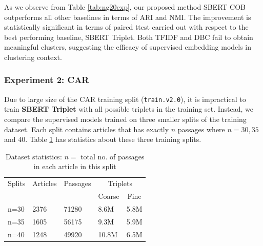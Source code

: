 \documentclass[11pt,a4paper]{article}
\begin{document}
As we observe from Table \ref{tab:ng20exp}, our proposed method SBERT COB outperforms all other baselines in terms of ARI and NMI. The improvement is statistically significant in terms of paired ttest carried out with respect to the best performing baseline, SBERT Triplet. Both TFIDF and DBC fail to obtain meaningful clusters, suggesting the efficacy of supervised embedding models in clustering context.

\subsubsection{Experiment 2: CAR} Due to large size of the CAR training split (\texttt{train.v2.0}), it is impractical to train \textbf{SBERT Triplet} with all possible triplets in the training set. Instead, we compare the supervised models trained on three smaller splits of the training dataset. Each split contains articles that has exactly $n$ passages where $n=30, 35$ and $40$. Table \ref{tab:datsplit} has statistics about these three training splits. 

\begin{table}[h]
\caption{Dataset statistics: $n=$ total no. of passages in each article in this split}
\label{tab:datsplit}
\begin{tabular}{lllll}
\hline
\multicolumn{1}{c}{Splits} & \multicolumn{1}{c}{Articles} & \multicolumn{1}{c}{Passages} & \multicolumn{2}{c}{Triplets}                                  \\
\multicolumn{1}{c}{}       & \multicolumn{1}{c}{}         & \multicolumn{1}{c}{}         & \multicolumn{1}{c}{Coarse} & \multicolumn{1}{c}{Fine} \\ \hline
n=30 & 2376 & 71280 & 8.6M & 5.8M \\
n=35 & 1605 & 56175 & 9.3M & 5.9M \\
n=40 & 1248 & 49920 & 10.8M & 6.5M                                
\end{tabular}
\end{table}
\end{document}
